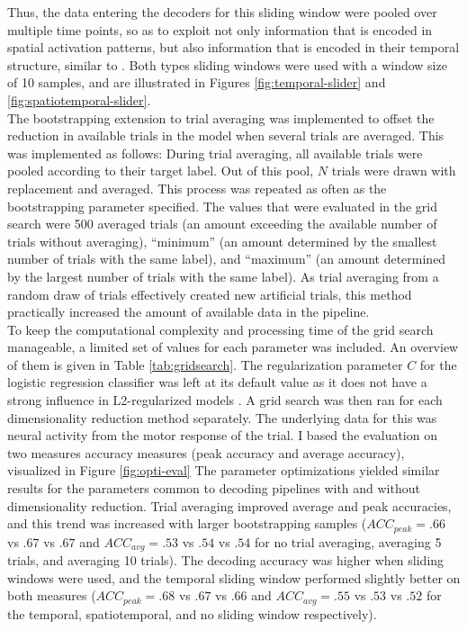 Thus, the data entering the decoders for this sliding window were pooled over multiple time points, so as to exploit not only information that is encoded in spatial activation patterns, but also information that is encoded in their temporal structure, similar to \citet{muhle2021hierarchy}.
Both types sliding windows were used with a window size of 10 samples, and are illustrated in Figures \ref{fig:temporal-slider} and \ref{fig:spatiotemporal-slider}.\\
The bootstrapping extension to trial averaging was implemented to offset the reduction in available trials in the model when several trials are averaged.
This was implemented as follows:
During trial averaging, all available trials were pooled according to their target label.
Out of this pool, $N$ trials were drawn with replacement and averaged.
This process was repeated as often as the bootstrapping parameter specified.
The values that were evaluated in the grid search were 500 averaged trials (an amount exceeding the available number of trials without averaging), ``minimum'' (an amount determined by the smallest number of trials with the same label), and ``maximum'' (an amount determined by the largest number of trials with the same label).
As trial averaging from a random draw of trials effectively created new artificial trials, this method practically increased the amount of available data in the pipeline.\\
To keep the computational complexity and processing time of the grid search manageable, a limited set of values for each parameter was included.
An overview of them is given in Table \ref{tab:gridsearch}.
The regularization parameter $C$ for the logistic regression classifier was left at its default value as it does not have a strong influence in L2-regularized models \citep{VAROQUAUX2017166}.
A grid search was then ran for each dimensionality reduction method separately.
The underlying data for this was neural activity from the motor response of the trial.
I based the evaluation on two measures accuracy measures (peak accuracy and average accuracy), visualized in Figure \ref{fig:opti-eval}
The parameter optimizations yielded similar results for the parameters common to decoding pipelines with and without dimensionality reduction.
Trial averaging improved average and peak accuracies, and this trend was increased with larger bootstrapping samples ($ACC_{peak} = .66$ vs $.67$ vs $.67$ and $ACC_{avg} = .53$ vs $.54$ vs $.54$ for no trial averaging, averaging 5 trials, and averaging 10 trials).
The decoding accuracy was higher when sliding windows were used, and the temporal sliding window performed slightly better on both measures ($ACC_{peak} = .68$ vs $.67$ vs $.66$ and $ACC_{avg} = .55$ vs $.53$ vs $.52$ for the temporal, spatiotemporal, and no sliding window respectively).
